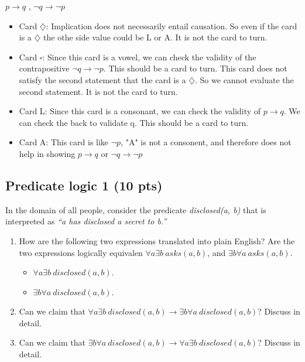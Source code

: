 \documentclass[12pt]{article}
\begin{document}
$ p \rightarrow q$ , $ \neg q \rightarrow \neg p$
\begin{itemize}
	\item Card \textbf{$\diamondsuit$}: Implication does not necessarily entail causation. So even if the card is a \textbf{$\diamondsuit$} the othe side value could be L or A. It is not the card to turn.

	\item Card \textbf{$\square$}: Since this card is a vowel, we can check the validity of the contrapositive $ \neg q \rightarrow \neg p$. This should be a card to turn. This card does not satisfy the second statement that the card is a \textbf{$\diamondsuit$}. So we cannot evaluate the second statement. It is not the card to turn.
	
	\item Card L: Since this card is a consonant, we can check the validity of $ p \rightarrow q$. We can check the back to validate q. This should be a card to turn.
	
	\item Card A: This card is like $ \neg p $, "A" is not a consonent, and therefore does not help in showing $ p \rightarrow q$ or $ \neg q \rightarrow \neg p$
	
\end{itemize}

\newpage

\subsection{Predicate logic 1 (10 pts)}

In the domain of all people, consider the predicate \textit{disclosed(a, b)} that is interpreted as \textit{``a has disclosed a secret to  b.''}
\begin{enumerate}
\item How are the following two expressions translated into plain English? Are the two expressions logically equivalen $\forall a \exists b~asks(a, b)$, and $\exists b \forall a ~asks(a, b)$.
\begin{itemize}
	\item $\forall a \exists b~disclosed(a, b)$.
	\item $\exists b \forall a ~disclosed(a, b)$.
\end{itemize} 
\item Can we claim that $\forall a \exists b~disclosed(a, b) \rightarrow \exists b \forall a ~disclosed(a, b)$? Discuss in detail.
\item Can we claim that $\exists b \forall a ~disclosed(a, b) \rightarrow \forall a \exists b~disclosed(a, b)$? Discuss in detail.
\end{enumerate}
\end{document}
